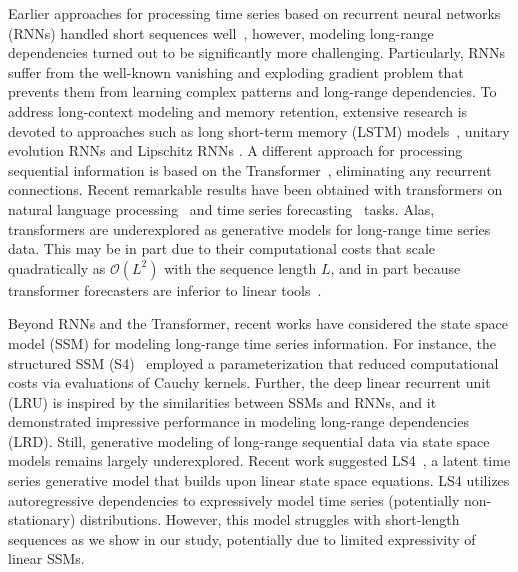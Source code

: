 \documentclass{article}
\begin{document}
Earlier approaches for processing time series based on recurrent neural networks (RNNs) handled short sequences well~\cite{mcculloch1943logical, amari1972learning, hopfield1982neural, rumelhart1985learning}, however, modeling long-range dependencies turned out to be significantly more challenging. Particularly, RNNs suffer from the well-known vanishing and exploding gradient problem \cite{bengio1994learning, pascanu2013difficulty} that prevents them from learning complex patterns and long-range dependencies. To address long-context modeling and memory retention, extensive research is devoted to approaches such as long short-term memory (LSTM) models~\cite{hochreiter1997long}, unitary evolution RNNs \cite{arjovsky2016unitary} and Lipschitz RNNs \cite{erichson2021lipschitz}. A different approach for processing sequential information is based on the Transformer~\cite{vaswani2017attention}, eliminating any recurrent connections. Recent remarkable results have been obtained with transformers on natural language processing~\cite{brown2020language} and time series forecasting~\cite{wu2021autoformer, zhou2022fedformer, nie2023time} tasks. Alas, transformers are underexplored as generative models for long-range time series data. This may be in part due to their computational costs that scale quadratically as $\mathcal{O}(L^2)$ with the sequence length $L$, and in part because transformer forecasters are inferior to linear tools~\cite{zeng2023transformers}. 


Beyond RNNs and the Transformer, recent works have considered the state space model (SSM) for modeling long-range time series information. For instance, the structured SSM (S4)~\cite{gu2021efficiently} employed a parameterization that reduced computational costs via evaluations of Cauchy kernels. Further, the deep linear recurrent unit (LRU) is inspired by the similarities between SSMs and RNNs, and it demonstrated impressive performance in modeling long-range dependencies (LRD). Still, generative modeling of long-range sequential data via state space models remains largely underexplored. Recent work suggested LS4~\cite{zhou2023deep}, a latent time series generative model that builds upon linear state space equations. LS4 utilizes autoregressive dependencies to expressively model time series (potentially non-stationary) distributions. However, this model struggles with short-length sequences as we show in our study, potentially due to limited expressivity of linear SSMs.
\end{document}
